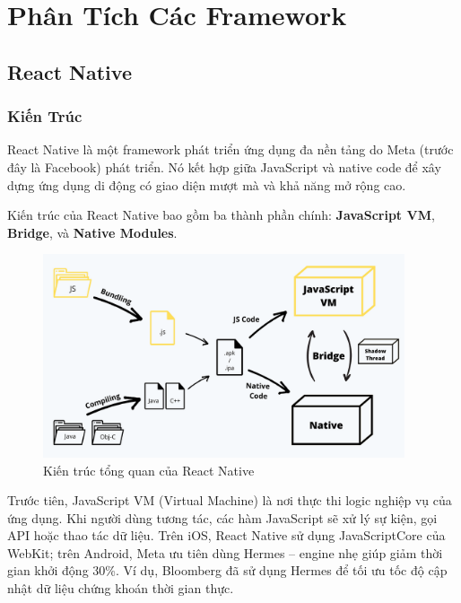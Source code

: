 \section{Phân Tích Các Framework}

\subsection{React Native}
\renewcommand{\labelitemi}{--}    
\subsubsection{Kiến Trúc}

\begin{sloppypar}
React Native là một framework phát triển ứng dụng đa nền tảng do Meta (trước đây là Facebook) phát triển.  
Nó kết hợp giữa JavaScript và native code để xây dựng ứng dụng di động có giao diện mượt mà và khả năng mở rộng cao.
\end{sloppypar}

\begin{sloppypar}
Kiến trúc của React Native bao gồm ba thành phần chính: \textbf{JavaScript VM}, \textbf{Bridge}, và \textbf{Native Modules}.
\end{sloppypar}

\begin{figure}[H]
    \centering
    \includegraphics[width=0.95\textwidth]{images/react_native.png}
    \caption{Kiến trúc tổng quan của React Native}
\end{figure}

\begin{sloppypar}
Trước tiên, JavaScript VM (Virtual Machine) là nơi thực thi logic nghiệp vụ của ứng dụng.  
Khi người dùng tương tác, các hàm JavaScript sẽ xử lý sự kiện, gọi API hoặc thao tác dữ liệu.  
Trên iOS, React Native sử dụng JavaScriptCore của WebKit; trên Android, Meta ưu tiên dùng Hermes – engine nhẹ giúp giảm thời gian khởi động 30\%.  
Ví dụ, Bloomberg đã sử dụng Hermes để tối ưu tốc độ cập nhật dữ liệu chứng khoán thời gian thực.
\end{sloppypar}

